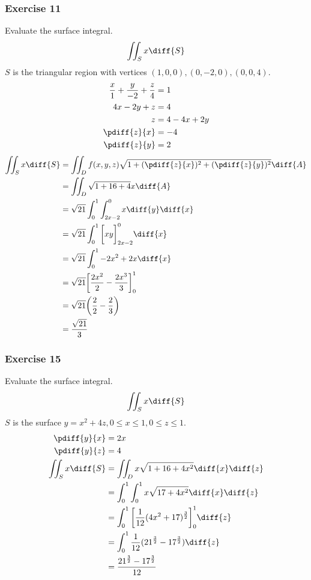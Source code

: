 \documentclass{math}
\begin{document}
\subsubsection*{Exercise 11}
Evaluate the surface integral.
\[ \iint_{S}x\diff{S} \]
\( S \) is the triangular region with vertices \( (1,0,0),(0,-2,0),(0,0,4) \).
\begin{align*}
  \frac{x}{1}+\frac{y}{-2}+\frac{z}{4} &= 1 \\
  4x-2y+z &= 4 \\
  z &= 4-4x+2y \\
  \pdiff{z}{x} &= -4 \\
  \pdiff{z}{y} &= 2
\end{align*}
\begin{align*}
  \iint_{S}x\diff{S} &=
    \iint_{D}f(x,y,z)\sqrt{1+(\pdiff{z}{x})^2+(\pdiff{z}{y})^2}\diff{A} \\
  &= \iint_{D}\sqrt{1+16+4}x\diff{A} \\
  &= \sqrt{21}\int_{0}^{1}\int_{2x-2}^{0}x\diff{y}\diff{x} \\
  &= \sqrt{21}\int_{0}^{1}\bigg[xy\bigg]_{2x-2}^{0}\diff{x} \\
  &= \sqrt{21}\int_{0}^{1}-2x^2+2x\diff{x} \\
  &= \sqrt{21}\bigg[\frac{2x^2}{2}-\frac{2x^3}{3}\bigg]_{0}^{1} \\
  &= \sqrt{21}\bigg(\frac{2}{2}-\frac{2}{3}\bigg) \\
  &= \frac{\sqrt{21}}{3}
\end{align*}

\subsubsection*{Exercise 15}
Evaluate the surface integral.
\[ \iint_{S}x\diff{S} \]
\( S \) is the surface \( y = x^2+4z,0\le x\le1,0\le z\le 1 \).
\begin{align*}
  \pdiff{y}{x} &= 2x \\
  \pdiff{y}{z} &= 4 \\
  \iint_{S}x\diff{S} &= \iint_{D}x\sqrt{1+16+4x^2}\diff{x}\diff{z} \\
  &= \int_{0}^{1}\int_{0}^{1}x\sqrt{17+4x^2}\diff{x}\diff{z} \\
  &= \int_{0}^{1}\bigg[\frac{1}{12}(4x^2+17)^{\frac{3}{2}}\bigg]_{0}^{1}
    \diff{z} \\
  &= \int_{0}^{1}\frac{1}{12}(21^{\frac{3}{2}}-17^{\frac{3}{2}})\diff{z} \\
  &= \frac{21^{\frac{3}{2}}-17^{\frac{3}{2}}}{12}
\end{align*}
\end{document}
